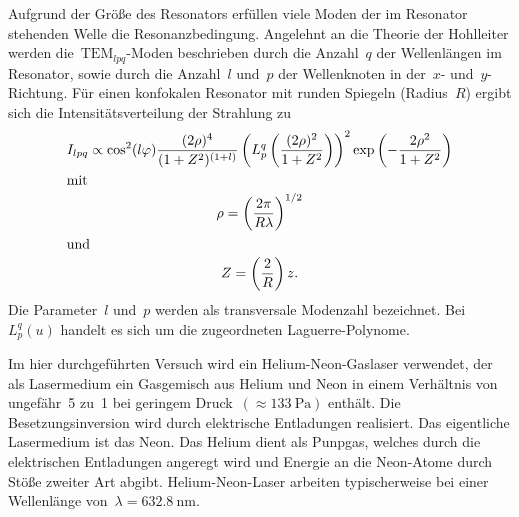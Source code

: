 Aufgrund der Größe des Resonators erfüllen viele Moden der im Resonator
stehenden Welle die Resonanzbedingung. Angelehnt an die Theorie der Hohlleiter
werden die~$\text{TEM}_{lpq}$-Moden beschrieben durch die Anzahl~$q$ der
Wellenlängen im Resonator, sowie durch die Anzahl~$l$ und~$p$ der Wellenknoten
in der~$x$- und~$y$-Richtung. Für einen konfokalen Resonator mit runden Spiegeln
(Radius~$R$) ergibt sich die Intensitätsverteilung der Strahlung zu
%
\begin{gather}
  I_{lpq}\propto\cos^2(l\varphi)\frac{(2\rho)^4}{(1+Z^2)^{(1+l)}}\left(L_p^q\left(\frac{(2\rho)^2}{1+Z^2}\right)\right)^2\exp\left(-\frac{2\rho^2}{1+Z^2}\right) \\
  \shortintertext{mit}
  \rho=\left(\frac{2\pi}{R\lambda}\right)^{1/2} \\
  \shortintertext{und}
  Z=\left(\frac{2}{R}\right)z.
\end{gather}
%
Die Parameter~$l$ und~$p$ werden als transversale Modenzahl bezeichnet.
Bei~$L_p^q(u)$ handelt es sich um die zugeordneten Laguerre-Polynome.

Im hier durchgeführten Versuch wird ein Helium-Neon-Gaslaser verwendet, der als
Lasermedium ein Gasgemisch aus Helium und Neon in einem Verhältnis von
ungefähr~\num{5} zu~\num{1} bei geringem Druck~$(\approx\SI{133}{\pascal})$
enthält. Die Besetzungsinversion wird durch elektrische Entladungen realisiert.
Das eigentliche Lasermedium ist das Neon. Das Helium dient als Punpgas, welches
durch die elektrischen Entladungen angeregt wird und Energie an die Neon-Atome
durch Stöße zweiter Art abgibt. Helium-Neon-Laser arbeiten typischerweise bei
einer Wellenlänge von~$\lambda=\SI{632.8}{\nano\metre}$.
